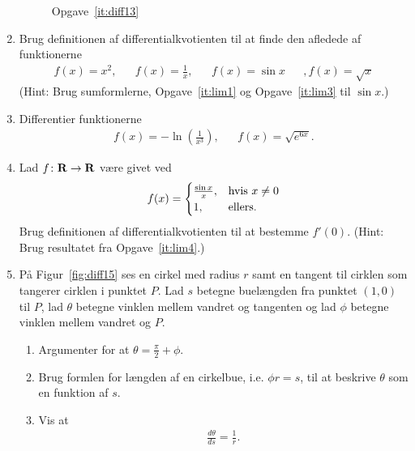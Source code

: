 \begin{enumerate}
	\begin{figure}
		\centering
		\caption{Opgave~\ref{it:diff13}}
		\label{fig:diff13}
	\end{figure}
	
	\item Brug definitionen af differentialkvotienten til at finde den afledede af funktionerne
	\begin{align*}
	f(x)=x^2,&&f(x)=\frac{1}{x},&&f(x)=\sin x&&, f(x)=\sqrt{x}
	\end{align*}
	(Hint: Brug sumformlerne, Opgave~\ref{it:lim1} og Opgave~\ref{it:lim3} til $\sin x$.)
	
	\item Differentier funktionerne
	\begin{align*}
	f(x)=-\ln(\frac{1}{x^3}),&& f(x)=\sqrt{e^{6x}}.
	\end{align*}
	
	\item \label{it:diff14} Lad $f\colon \mathbf{R}\to \mathbf{R}$ være givet ved
	\begin{align*}
	f(x)=\begin{cases}
	\frac{\sin x}{x},&\textup{hvis }x\neq 0\\
	1,&\textup{ellers}. 
	\end{cases}
	\end{align*}
	Brug definitionen af differentialkvotienten til at bestemme $f'(0)$. (Hint: Brug resultatet fra Opgave~\ref{it:lim4}.)
	
	\item\label{it:diff15} På Figur~\ref{fig:diff15} ses en cirkel med radius $r$ samt en tangent til cirklen som tangerer cirklen i punktet $P$. Lad $s$ betegne buelængden fra punktet $(1,0) $ til $ P $, lad $\theta$ betegne vinklen mellem vandret og tangenten og lad $\phi$ betegne vinklen mellem vandret og $P$.
	
	\begin{enumerate}
		\item Argumenter for at $\theta=\frac{\pi}{2}+\phi$.
		\item Brug formlen for længden af en cirkelbue, i.e. $ \phi r=s $, til at beskrive $ \theta $ som en funktion af $s$. 
		\item Vis at
		\begin{align*}
		\frac{d \theta}{d s}= \frac{1}{r}.
		\end{align*}
	\end{enumerate}
	

\end{enumerate}
